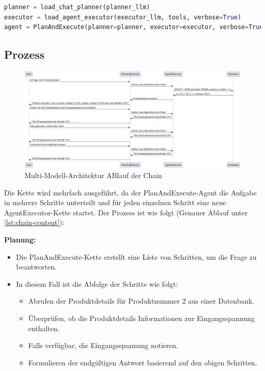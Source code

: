 \begin{lstlisting}[language=Python, style=pythonstyle, caption={Definition des Agents}]
planner = load_chat_planner(planner_llm)
executor = load_agent_executor(executor_llm, tools, verbose=True)
agent = PlanAndExecute(planner=planner, executor=executor, verbose=True)
\end{lstlisting}




\subsection{Prozess}

\begin{figure}[H]
    \centering
    \includegraphics[width=1\textwidth]{Figures/diagramms/activity-chain.png}
    \caption{Multi-Modell-Architektur ABlauf der Chain}
    \label{fig:multi-model-architecture}
\end{figure}

Die Kette wird mehrfach ausgeführt, da der PlanAndExecute-Agent die Aufgabe in mehrere Schritte unterteilt und für jeden einzelnen Schritt eine neue AgentExecutor-Kette startet. Der Prozess ist wie folgt (Genauer Ablauf unter \autoref{lst:chain-content}):

\textbf{Planung:}
\begin{itemize}
    \item Die PlanAndExecute-Kette erstellt eine Liste von Schritten, um die Frage zu beantworten.
    \item In diesem Fall ist die Abfolge der Schritte wie folgt:
    \begin{itemize}
        \item Abrufen der Produktdetails für Produktnummer 2 aus einer Datenbank.
        \item Überprüfen, ob die Produktdetails Informationen zur Eingangsspannung enthalten.
        \item Falls verfügbar, die Eingangsspannung notieren.
        \item Formulieren der endgültigen Antwort basierend auf den obigen Schritten.
    \end{itemize}
\end{itemize}

